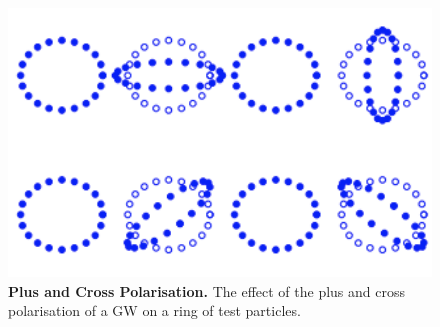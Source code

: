 \documentclass[11pt]{cuthesis}
\begin{document}
\begin{figure}[ht]
\centering 
\includegraphics[width=12cm]{polarisations.png} 
\caption{ \textbf{Plus and Cross Polarisation.} The effect of the plus and cross polarisation of a GW on a ring of test particles. \cite{mckechan-thesis} }
\label{fig:polarisations}
\end{figure} 
\end{document}
